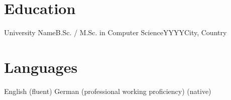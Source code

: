 \section{Education}

\cveducation
  {University Name}{B.Sc. / M.Sc. in Computer Science}{YYYY}{City, Country}

\section{Languages}

English (fluent) \quad German (professional working proficiency)  (native)


